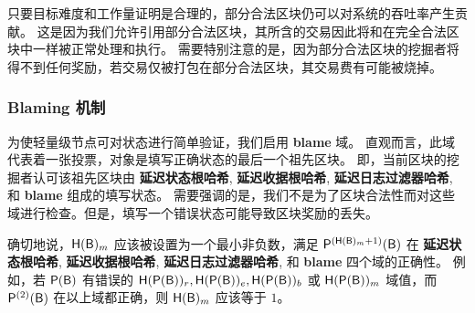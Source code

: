 只要目标难度和工作量证明是合理的，部分合法区块仍可以对系统的吞吐率产生贡献。
这是因为我们允许引用部分合法区块，其所含的交易因此将和在完全合法区块中一样被正常处理和执行。
% 
需要特别注意的是，因为部分合法区块的挖掘者将得不到任何奖励，若交易仅被打包在部分合法区块，其交易费有可能被烧掉。





\subsubsection{Blaming 机制}
\label{sec:blaming}
	
	为使轻量级节点可对状态进行简单验证，我们启用 {\bf blame} 域。
	直观而言，此域代表着一张投票，对象是填写正确状态的最后一个祖先区块。
	即，当前区块的挖掘者认可该祖先区块由 {\bf 延迟状态根哈希}, {\bf 延迟收据根哈希}, {\bf 延迟日志过滤器哈希}, 和 {\bf blame} 组成的填写状态。
	需要强调的是，我们不是为了区块合法性而对这些域进行检查。但是，填写一个错误状态可能导致区块奖励的丢失。


	确切地说，$\textsf{H}(\textsf{B})_{m}$ 应该被设置为一个最小非负数，满足 $\mathsf{P}^{\left(\textsf{H}(\textsf{B})_{m}+1\right)}(\textsf{B})$ 在 {\bf 延迟状态根哈希}, {\bf 延迟收据根哈希}, {\bf 延迟日志过滤器哈希}, 和 {\bf blame} 四个域的正确性。
	例如，若 $\mathsf{P}{\left({\textsf{B}} \right)}$ 有错误的 $\textsf{H}(\mathsf{P}{\left({\textsf{B}} \right)})_{r}, \textsf{H}(\mathsf{P}{\left({\textsf{B}} \right)})_{e}, \textsf{H}(\mathsf{P}{\left({\textsf{B}} \right)})_{b}$ 或 $\textsf{H}(\mathsf{P}{\left({\textsf{B}} \right)})_{m}$ 域值，而 $\mathsf{P}^{(2)}(\textsf{B})$ 在以上域都正确，则 $\textsf{H}(\textsf{B})_{m}$ 应该等于 $1$。 


